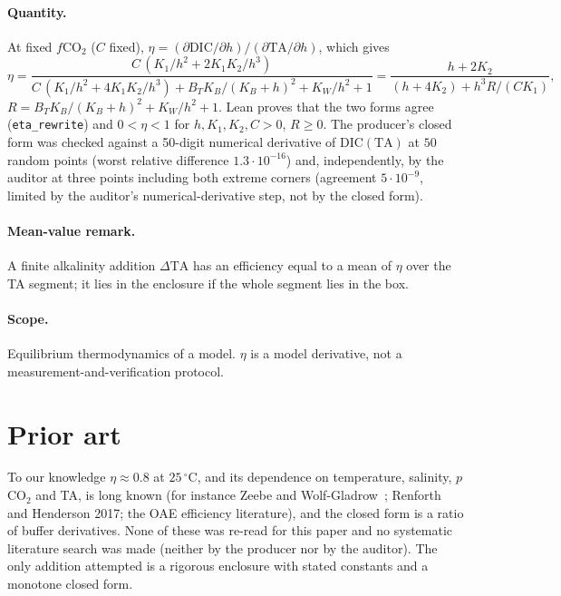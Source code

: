 \documentclass[10pt]{article}
\newcommand{\lean}[1]{\texttt{#1}}
\newcommand{\COtwo}{CO$_2$}
\begin{document}
\paragraph{Quantity.} At fixed $f\mathrm{CO_2}$ ($C$ fixed), $\eta=(\partial\mathrm{DIC}/\partial h)/(\partial\mathrm{TA}/\partial h)$, which gives
\[
\eta=\frac{C\,(K_1/h^2+2K_1K_2/h^3)}{C\,(K_1/h^2+4K_1K_2/h^3)+B_TK_B/(K_B+h)^2+K_W/h^2+1}
=\frac{h+2K_2}{(h+4K_2)+h^3R/(CK_1)},
\]
$R=B_TK_B/(K_B+h)^2+K_W/h^2+1$. Lean proves that the two forms agree (\lean{eta\_rewrite}) and $0<\eta<1$ for $h,K_1,K_2,C>0$, $R\ge0$. The producer's closed form was checked against a 50-digit numerical derivative of $\mathrm{DIC}(\mathrm{TA})$ at $50$ random points (worst relative difference $1.3\cdot10^{-16}$) and, independently, by the auditor at three points including both extreme corners (agreement $5\cdot10^{-9}$, limited by the auditor's numerical-derivative step, not by the closed form).
\paragraph{Mean-value remark.} A finite alkalinity addition $\Delta\mathrm{TA}$ has an efficiency equal to a mean of $\eta$ over the TA segment; it lies in the enclosure if the whole segment lies in the box.
\paragraph{Scope.} Equilibrium thermodynamics of a model. $\eta$ is a model derivative, not a measurement-and-verification protocol.

\section{Prior art}\label{sec:prior}
To our knowledge $\eta\approx0.8$ at $25\,^\circ$C, and its dependence on temperature, salinity, $p$\COtwo{} and TA, is long known (for instance Zeebe and Wolf-Gladrow~\cite{zwg}; Renforth and Henderson 2017; the OAE efficiency literature), and the closed form is a ratio of buffer derivatives. None of these was re-read for this paper and no systematic literature search was made (neither by the producer nor by the auditor). The only addition attempted is a rigorous enclosure with stated constants and a monotone closed form.

\end{document}
